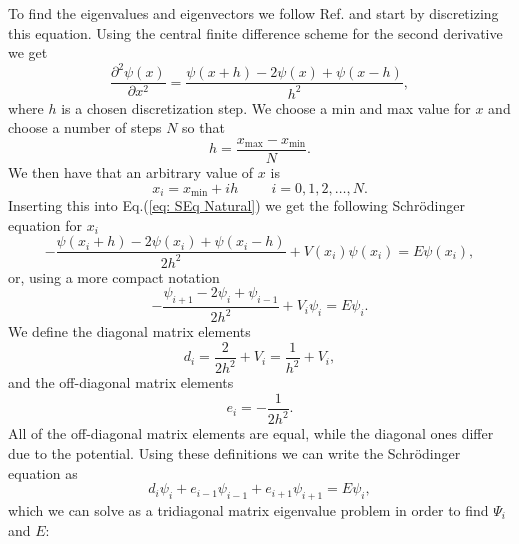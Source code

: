 \documentclass[../main.tex]{subfiles}
\begin{document}
To find the eigenvalues and eigenvectors we follow Ref.\cite{FYS4411-LectureNotes} and start by discretizing this equation. Using the central finite difference scheme\cite{Scientific Computing} for the second derivative we get
\begin{equation}
    \frac{\partial^2\psi(x)}{\partial x^2} = \frac{\psi(x+h) - 2\psi(x) + \psi(x-h)}{h^2},
\end{equation}
where $h$ is a chosen discretization step. We choose a min and max value for $x$ and choose a number of steps $N$ so that \begin{equation}
    h = \frac{x_{\mathrm{max}}-x_{\mathrm{min}}}{N}.
\end{equation}
We then have that an arbitrary value of $x$ is 
\begin{equation}
    x_i = x_{\mathrm{min}} + ih \hspace{1cm} i = 0,1,2,\dots,N.
\end{equation}
Inserting this into Eq.(\ref{eq: SEq Natural}) we get the following Schr\"odinger equation for $x_i$
\begin{equation}
    -\frac{\psi(x_i+h) - 2\psi(x_i) + \psi(x_i-h)}{2h^2} + V(x_i)\psi(x_i) = E\psi(x_i),
\end{equation}
or, using a more compact notation
\begin{equation}
    -\frac{\psi_{i+1} - 2\psi_i + \psi_{i-1}}{2h^2} + V_i\psi_i = E\psi_i.
\end{equation}
We define the diagonal matrix elements
\begin{equation}
    d_i = \frac{2}{2h^2} + V_i = \frac{1}{h^2} + V_i,
\end{equation}
and the off-diagonal matrix elements
\begin{equation}
    e_i = -\frac{1}{2h^2}.
\end{equation}
All of the off-diagonal matrix elements are equal, while the diagonal ones differ due to the potential. Using these definitions we can write the Schr\"odinger equation as
\begin{equation}
    d_i\psi_i + e_{i-1}\psi_{i-1} + e_{i+1}\psi_{i+1} = E\psi_i,
\end{equation}
which we can solve as a tridiagonal matrix eigenvalue problem in order to find $\Psi_i$ and $E$:
\end{document}
